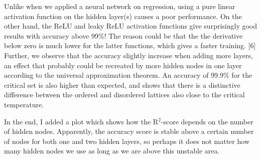 Unlike when we applied a neural network on regression, using a pure linear activation function on the hidden layer(s) causes a poor performance. On the other hand, the ReLU and leaky ReLU activation functions give surprisingly good results with accuracy above 99\%! The reason could be that the the derivative below zero is much lower for the latter functions, which gives a faster training. [6] Further, we observe that the accuracy slightly increase when adding more layers, an effect that probably could be recreated by more hidden nodes in one layer according to the universal approximation theorem. An accuracy of 99.9\% for the critical set is also higher than expected, and shows that there is a distinctive difference between the ordered and disordered lattices also close to the critical temperature. 

In the end, I added a plot which shows how the R$^2$-score depends on the number of hidden nodes. Apparently, the accuracy score is stable above a certain number of nodes for both one and two hidden layers, so perhaps it does not matter how many hidden nodes we use as long as we are above this unstable area. 

